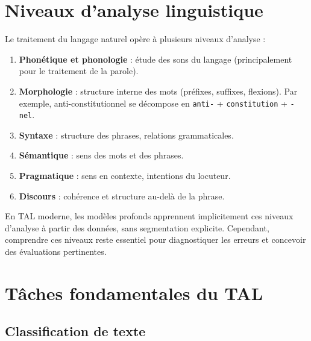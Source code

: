 \section{Niveaux d'analyse linguistique}
\label{sec:intro:niveaux}

Le traitement du langage naturel op\`ere \`a plusieurs niveaux d'analyse :

\begin{enumerate}
    \item \textbf{Phon\'etique et phonologie} : \'etude des sons du langage
          (principalement pour le traitement de la parole).
    \item \textbf{Morphologie} : structure interne des mots (pr\'efixes,
          suffixes, flexions). Par exemple, \og anti-constitutionnel\fg
          se d\'ecompose en \texttt{anti-} + \texttt{constitution} +
          \texttt{-nel}.
    \item \textbf{Syntaxe} : structure des phrases, relations grammaticales.
    \item \textbf{S\'emantique} : sens des mots et des phrases.
    \item \textbf{Pragmatique} : sens en contexte, intentions du locuteur.
    \item \textbf{Discours} : coh\'erence et structure au-del\`a de la phrase.
\end{enumerate}

\begin{remarque}
En TAL moderne, les mod\`eles profonds apprennent implicitement ces niveaux
d'analyse \`a partir des donn\'ees, sans segmentation explicite. Cependant,
comprendre ces niveaux reste essentiel pour diagnostiquer les erreurs et
concevoir des \'evaluations pertinentes.
\end{remarque}

\section{T\^aches fondamentales du TAL}
\label{sec:intro:taches}

\subsection{Classification de texte}

